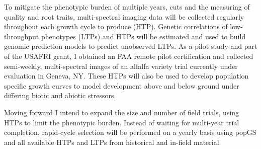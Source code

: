 \documentclass[11pt]{article}
\begin{document}
To mitigate the phenotypic burden of multiple years, cuts and the measuring of quality and root traits, multi-spectral imaging data will be collected regularly throughout each growth cycle to produce (HTP). Genetic correlations of low-throughput phenotypes (LTPs) and HTPs will be estimated and used to build genomic prediction models to predict unobserved LTPs. As a pilot study and part of the USAFRI grant, I obtained an FAA remote pilot certification and collected semi-weekly, multi-spectral images of an alfalfa variety trial currently under evaluation in Geneva, NY. These HTPs will also be used to develop population specific growth curves to model development above and below ground under differing biotic and abiotic stressors. 

Moving forward I intend to expand the size and number of field trials, using HTPs to limit the phenotypic burden. Instead of waiting for multi-year trial completion, rapid-cycle selection will be performed on a yearly basis using popGS and all available HTPs and LTPs from historical and in-field material. %







\end{document}

